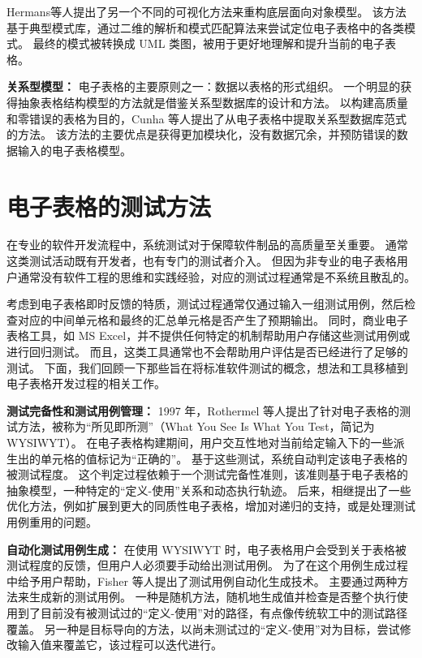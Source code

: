 Hermans等人\cite{hermans2010automatically}提出了另一个不同的可视化方法来重构底层面向对象模型。
该方法基于典型模式库，通过二维的解析和模式匹配算法来尝试定位电子表格中的各类模式。
最终的模式被转换成 UML 类图，被用于更好地理解和提升当前的电子表格。

\textbf{关系型模型：}
电子表格的主要原则之一：数据以表格的形式组织。
一个明显的获得抽象表格结构模型的方法就是借鉴关系型数据库的设计和方法。
以构建高质量和零错误的表格为目的，Cunha 等人\cite{cunha2009spreadsheets}提出了从电子表格中提取关系型数据库范式的方法。
该方法的主要优点是获得更加模块化，没有数据冗余，并预防错误的数据输入的电子表格模型\cite{cunha2009discovery,cunha2012relational}。



\section{电子表格的测试方法}

在专业的软件开发流程中，系统测试对于保障软件制品的高质量至关重要。
通常这类测试活动既有开发者，也有专门的测试者介入。
但因为非专业的电子表格用户通常没有软件工程的思维和实践经验，对应的测试过程通常是不系统且散乱的。

考虑到电子表格即时反馈的特质，测试过程通常仅通过输入一组测试用例，然后检查对应的中间单元格和最终的汇总单元格是否产生了预期输出。
同时，商业电子表格工具，如 MS Excel，并不提供任何特定的机制帮助用户存储这些测试用例或进行回归测试。
而且，这类工具通常也不会帮助用户评估是否已经进行了足够的测试。
下面，我们回顾一下那些旨在将标准软件测试的概念，想法和工具移植到电子表格开发过程的相关工作。

\textbf{测试完备性和测试用例管理：}
1997 年，Rothermel 等人\cite{rothermel1997testing,rothermel1998you,rothermel2001methodology}提出了针对电子表格的测试方法，被称为“所见即所测”（What You See Is What You Test，简记为 WYSIWYT）。
在电子表格构建期间，用户交互性地对当前给定输入下的一些派生出的单元格的值标记为“正确的”。
基于这些测试，系统自动判定该电子表格的被测试程度。
这个判定过程依赖于一个测试完备性准则，该准则基于电子表格的抽象模型，一种特定的“定义-使用”关系和动态执行轨迹。
后来，相继提出了一些优化方法，例如扩展到更大的同质性电子表格，增加对递归的支持，或是处理测试用例重用的问题\cite{burnett1999scaling,burnett2001visually,burnett2002testing,fisher2002automated,fisher2006scaling,randolph2002generalised}。

\textbf{自动化测试用例生成：}
在使用 WYSIWYT 时，电子表格用户会受到关于表格被测试程度的反馈，但用户人必须要手动给出测试用例。
为了在这个用例生成过程中给予用户帮助，Fisher 等人\cite{fisher2002automated,fisher2006integrating}提出了测试用例自动化生成技术。
主要通过两种方法来生成新的测试用例。
一种是随机方法，随机地生成值并检查是否整个执行使用到了目前没有被测试过的“定义-使用”对的路径，有点像传统软工中的测试路径覆盖。
另一种是目标导向的方法，以尚未测试过的“定义-使用”对为目标，尝试修改输入值来覆盖它，该过程可以迭代进行。

